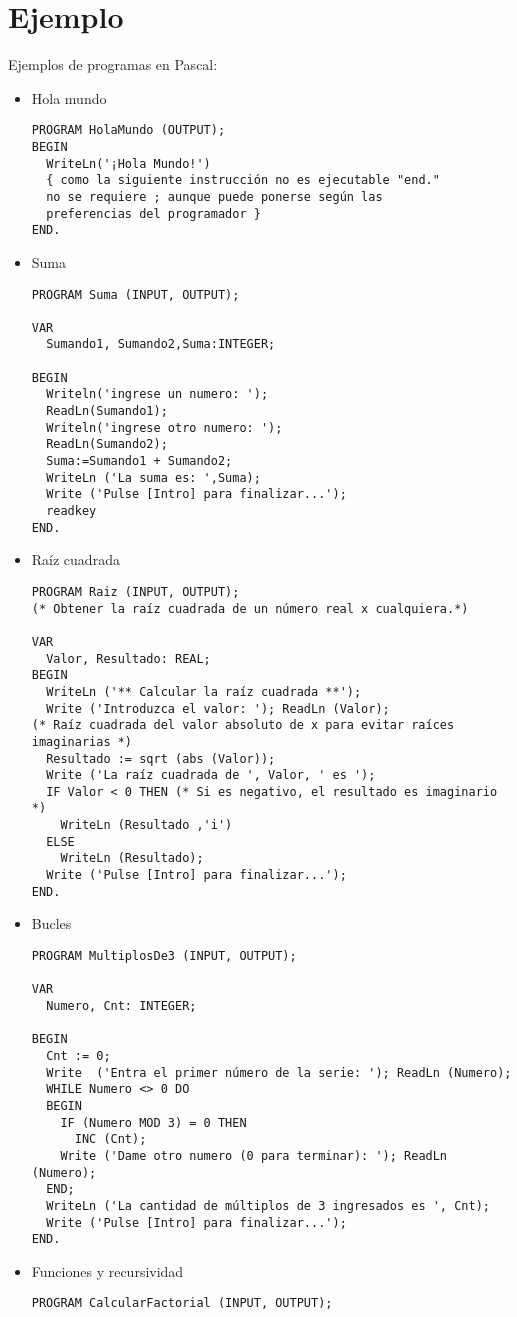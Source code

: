\documentclass{IEEEtran}
\begin{document}
\section{Ejemplo}
Ejemplos de programas en Pascal:
\begin{itemize}
\item Hola mundo
\begin{lstlisting}
PROGRAM HolaMundo (OUTPUT);
BEGIN
  WriteLn('¡Hola Mundo!')
  { como la siguiente instrucción no es ejecutable "end." 
  no se requiere ; aunque puede ponerse según las
  preferencias del programador }
END.
\end{lstlisting}
\item Suma
\begin{lstlisting}
PROGRAM Suma (INPUT, OUTPUT);

VAR
  Sumando1, Sumando2,Suma:INTEGER;                                                              

BEGIN
  Writeln('ingrese un numero: ');
  ReadLn(Sumando1);
  Writeln('ingrese otro numero: ');
  ReadLn(Sumando2);
  Suma:=Sumando1 + Sumando2;
  WriteLn ('La suma es: ',Suma);
  Write ('Pulse [Intro] para finalizar...');
  readkey
END.
\end{lstlisting}
\item Ra\'iz cuadrada
\begin{lstlisting}
PROGRAM Raiz (INPUT, OUTPUT);
(* Obtener la raíz cuadrada de un número real x cualquiera.*)

VAR 
  Valor, Resultado: REAL;
BEGIN
  WriteLn ('** Calcular la raíz cuadrada **');
  Write ('Introduzca el valor: '); ReadLn (Valor);
(* Raíz cuadrada del valor absoluto de x para evitar raíces imaginarias *)
  Resultado := sqrt (abs (Valor));
  Write ('La raíz cuadrada de ', Valor, ' es ');
  IF Valor < 0 THEN (* Si es negativo, el resultado es imaginario *)
    WriteLn (Resultado ,'i')
  ELSE
    WriteLn (Resultado);
  Write ('Pulse [Intro] para finalizar...');
END.
\end{lstlisting}
\item Bucles
\begin{lstlisting}
PROGRAM MultiplosDe3 (INPUT, OUTPUT);

VAR
  Numero, Cnt: INTEGER;

BEGIN
  Cnt := 0;
  Write  ('Entra el primer número de la serie: '); ReadLn (Numero);
  WHILE Numero <> 0 DO
  BEGIN
    IF (Numero MOD 3) = 0 THEN
      INC (Cnt);
    Write ('Dame otro numero (0 para terminar): '); ReadLn (Numero);
  END;
  WriteLn ('La cantidad de múltiplos de 3 ingresados es ', Cnt);
  Write ('Pulse [Intro] para finalizar...');
END.
\end{lstlisting}
\item Funciones y recursividad
\begin{lstlisting}
PROGRAM CalcularFactorial (INPUT, OUTPUT);


\end{lstlisting}
\end{itemize}
\end{document}
